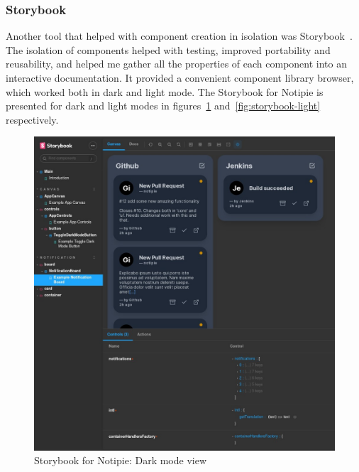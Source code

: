 \subsubsection{Storybook}\label{sec:storybook}

Another tool that helped with
component creation in isolation
was Storybook~\cite{shilman_storybook_2022}.
The isolation of components
helped with testing,
improved portability and reusability,
and helped me gather all the properties
of each component into an interactive
documentation.
It provided a convenient component library browser,
which worked both in dark and light mode.
The Storybook for Notipie is presented
for dark and light modes in
figures~\ref{fig:storybook-dark}
and~\ref{fig:storybook-light}
respectively.

\begin{figure}[p]
  \centering
  \includegraphics[width=\linewidth,keepaspectratio]{img/storybook.jpg}
  \caption{Storybook for Notipie: Dark mode view}
  \label{fig:storybook-dark}
\end{figure}

